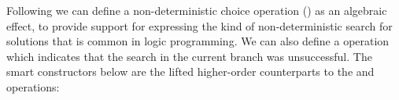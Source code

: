 Following \cite{DBLP:conf/ppdp/SchrijversWDD14,WuSH14,YangPWBS22} we can define a non-deterministic choice operation () as an algebraic effect, to provide support for expressing the kind of non-deterministic search for solutions that is common in logic programming.
We can also define a  operation which indicates that the search in the current branch was unsuccessful.
The smart constructors below are the lifted higher-order counterparts to the  and  operations:
\begin{code}[hide]%
\>[0][@{}l@{\AgdaIndent{1}}]%
\>[2]\AgdaSpace{}%
\AgdaSpace{}%
\<%
\\
\>[2][@{}l@{\AgdaIndent{0}}]%
\>[4]\AgdaSpace{}%
\<%
\\
%
\>[4]\AgdaSpace{}%
\<%
\\
%
\>[4]\AgdaSpace{}%
\<%
\\
\>[0]\<%
\end{code}
\begin{code}[hide]%
\>[0][@{}l@{\AgdaIndent{1}}]%
\>[4]\AgdaSpace{}%
\AgdaSpace{}%
\AgdaSymbol{:}\AgdaSpace{}%
\AgdaSpace{}%
\<%
\\
\>[4][@{}l@{\AgdaIndent{0}}]%
\>[6]%
\>[12]\AgdaSymbol{:}\AgdaSpace{}%
\<%
\\
%
\>[6]%
\>[12]\AgdaSymbol{:}\AgdaSpace{}%
\<%
\\
%
\\[\AgdaEmptyExtraSkip]%
%
\>[4]\AgdaSpace{}%
\AgdaSymbol{:}\AgdaSpace{}%
\<%
\\
%
\>[4]%
\>[8]\AgdaSpace{}%
\AgdaSymbol{=}\AgdaSpace{}%
\<%
\\
%
\>[4]\AgdaSpace{}%
\AgdaSpace{}%
\AgdaSpace{}%
\AgdaSymbol{=}\AgdaSpace{}%
\<%
\\
%
\>[4]\AgdaSpace{}%
\AgdaSpace{}%
\AgdaSpace{}%
\AgdaSymbol{=}\AgdaSpace{}%
\<%
\end{code}
\begin{code}[hide]%
%
\>[4]\AgdaSpace{}%
\AgdaSymbol{:}\AgdaSpace{}%
\AgdaSpace{}%
\AgdaSpace{}%
\AgdaSpace{}%
\AgdaSpace{}%
\AgdaSpace{}%
\AgdaSpace{}%
\AgdaSpace{}%
\AgdaSpace{}%
\<%
\\
%
\>[4]\<%
\end{code}
